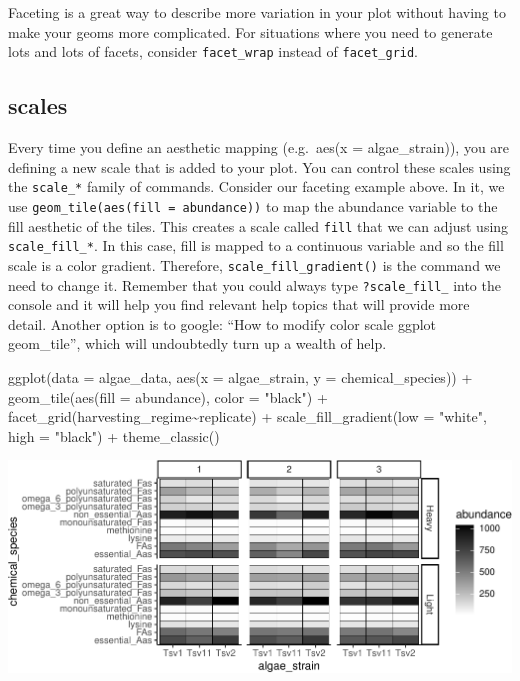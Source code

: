 \documentclass[
]{krantz}
\newenvironment{Shaded}{\begin{snugshade}}{\end{snugshade}}
\newcommand{\AttributeTok}[1]{\textcolor[rgb]{0.77,0.63,0.00}{#1}}
\newcommand{\FunctionTok}[1]{\textcolor[rgb]{0.00,0.00,0.00}{#1}}
\newcommand{\NormalTok}[1]{#1}
\newcommand{\SpecialCharTok}[1]{\textcolor[rgb]{0.00,0.00,0.00}{#1}}
\newcommand{\StringTok}[1]{\textcolor[rgb]{0.31,0.60,0.02}{#1}}
\begin{document}
Faceting is a great way to describe more variation in your plot without having to make your geoms more complicated. For situations where you need to generate lots and lots of facets, consider \texttt{facet\_wrap} instead of \texttt{facet\_grid}.

\hypertarget{scales}{%
\subsection{scales}\label{scales}}

Every time you define an aesthetic mapping (e.g.~aes(x = algae\_strain)), you are defining a new scale that is added to your plot. You can control these scales using the \texttt{scale\_*} family of commands. Consider our faceting example above. In it, we use \texttt{geom\_tile(aes(fill\ =\ abundance))} to map the abundance variable to the fill aesthetic of the tiles. This creates a scale called \texttt{fill} that we can adjust using \texttt{scale\_fill\_*}. In this case, fill is mapped to a continuous variable and so the fill scale is a color gradient. Therefore, \texttt{scale\_fill\_gradient()} is the command we need to change it. Remember that you could always type \texttt{?scale\_fill\_} into the console and it will help you find relevant help topics that will provide more detail. Another option is to google: ``How to modify color scale ggplot geom\_tile'', which will undoubtedly turn up a wealth of help.

\begin{Shaded}
\begin{Highlighting}[]
\FunctionTok{ggplot}\NormalTok{(}\AttributeTok{data =}\NormalTok{ algae\_data, }\FunctionTok{aes}\NormalTok{(}\AttributeTok{x =}\NormalTok{ algae\_strain, }\AttributeTok{y =}\NormalTok{ chemical\_species)) }\SpecialCharTok{+} 
  \FunctionTok{geom\_tile}\NormalTok{(}\FunctionTok{aes}\NormalTok{(}\AttributeTok{fill =}\NormalTok{ abundance), }\AttributeTok{color =} \StringTok{"black"}\NormalTok{) }\SpecialCharTok{+} 
  \FunctionTok{facet\_grid}\NormalTok{(harvesting\_regime}\SpecialCharTok{\textasciitilde{}}\NormalTok{replicate) }\SpecialCharTok{+}
  \FunctionTok{scale\_fill\_gradient}\NormalTok{(}\AttributeTok{low =} \StringTok{"white"}\NormalTok{, }\AttributeTok{high =} \StringTok{"black"}\NormalTok{) }\SpecialCharTok{+}
  \FunctionTok{theme\_classic}\NormalTok{()}
\end{Highlighting}
\end{Shaded}

\begin{center}\includegraphics[width=0.8\linewidth]{index_files/figure-latex/unnamed-chunk-60-1} \end{center}
\end{document}
